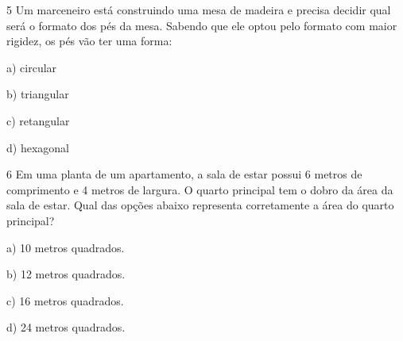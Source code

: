 
\num{5} Um marceneiro está construindo uma mesa de madeira e precisa decidir
qual será o formato dos pés da mesa. Sabendo que ele optou pelo formato
com maior rigidez, os pés vão ter uma forma:

a) circular

b) triangular

c) retangular

d) hexagonal



\num{6} Em uma planta de um apartamento, a sala de estar possui 6 metros de
comprimento e 4 metros de largura. O quarto principal tem o dobro da
área da sala de estar. Qual das opções abaixo representa corretamente a
área do quarto principal?

a) 10 metros quadrados.

b) 12 metros quadrados.

c) 16 metros quadrados.

d) 24 metros quadrados.


